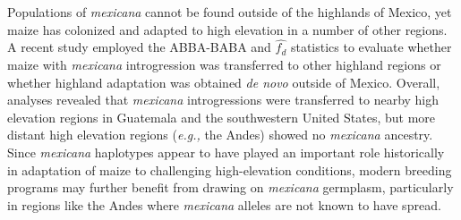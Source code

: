 \documentclass[11pt]{article}
\begin{document}
\begin{enumerate}
Populations of \emph{mexicana} cannot be found outside of the highlands of Mexico, yet maize has colonized and adapted to high elevation in a number of other regions.
A recent study \cite{wang2017} employed the ABBA-BABA and $\hat{f_{d}}$ statistics to evaluate whether maize with \emph{mexicana} introgression was transferred to other highland regions or whether highland adaptation was obtained \emph{de novo} outside of Mexico.
Overall, analyses revealed that  \emph{mexicana} introgressions were transferred to nearby high elevation regions in Guatemala and the southwestern United States, but more distant high elevation regions (\emph{e.g.,} the Andes) showed no \emph{mexicana} ancestry. 
Since \emph{mexicana} haplotypes appear to have played an important role historically in adaptation of maize to challenging high-elevation conditions, modern breeding programs may further benefit from drawing on \emph{mexicana} germplasm, particularly in regions like the Andes where \emph{mexicana} alleles are not known to have spread.



\end{enumerate}
\end{document}
